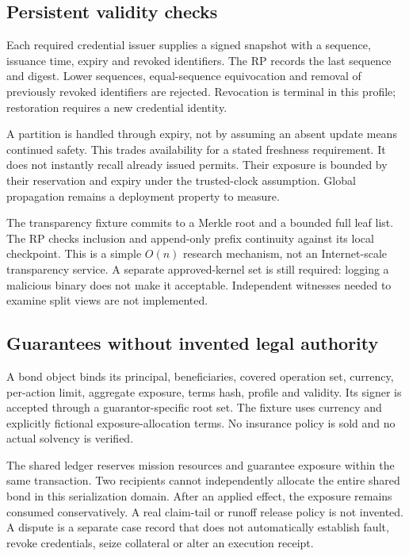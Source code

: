 \documentclass[journal,10pt]{IEEEtran}
\newcommand{\code}[1]{\texttt{\detokenize{#1}}}
\begin{document}
\subsection{Persistent validity checks}
Each required credential issuer supplies a signed snapshot with a sequence, issuance time, expiry and revoked identifiers. The RP records the last sequence and digest. Lower sequences, equal-sequence equivocation and removal of previously revoked identifiers are rejected. Revocation is terminal in this profile; restoration requires a new credential identity.

A partition is handled through expiry, not by assuming an absent update means continued safety. This trades availability for a stated freshness requirement. It does not instantly recall already issued permits. Their exposure is bounded by their reservation and expiry under the trusted-clock assumption. Global propagation remains a deployment property to measure.

The transparency fixture commits to a Merkle root and a bounded full leaf list. The RP checks inclusion and append-only prefix continuity against its local checkpoint. This is a simple $O(n)$ research mechanism, not an Internet-scale transparency service. A separate approved-kernel set is still required: logging a malicious binary does not make it acceptable. Independent witnesses needed to examine split views are not implemented.

\subsection{Guarantees without invented legal authority}
A bond object binds its principal, beneficiaries, covered operation set, currency, per-action limit, aggregate exposure, terms hash, profile and validity. Its signer is accepted through a guarantor-specific root set. The fixture uses currency \code{TEST} and explicitly fictional exposure-allocation terms. No insurance policy is sold and no actual solvency is verified.

The shared ledger reserves mission resources and guarantee exposure within the same transaction. Two recipients cannot independently allocate the entire shared bond in this serialization domain. After an applied effect, the exposure remains consumed conservatively. A real claim-tail or runoff release policy is not invented. A dispute is a separate case record that does not automatically establish fault, revoke credentials, seize collateral or alter an execution receipt.
\end{document}
